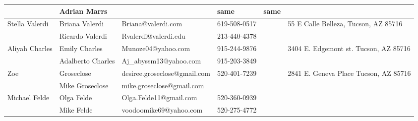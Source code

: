 \documentclass[landscape]{article}\usepackage[]{graphicx}\usepackage[]{color}
\begin{document}
\begin{longtable}{p{70pt}|p{75pt}|p{120pt}|p{60pt}|p{60pt}|p{120pt}|}
 & Adrian Marrs &  & same & same & \\
\hline
\multirow{2}{70pt}{Stella Valerdi} & Briana Valerdi & Briana@valerdi.com & 619-508-0517 &  & \multirow{2}{100pt}{55 E Calle Belleza, Tucson, AZ 85716} \\
 & Ricardo Valerdi & Rvalerdi@valerdi.edu & 213-440-4378 &  & \\
\hline
\multirow{2}{70pt}{Aliyah Charles} & Emily Charles  & Munoze04@yahoo.com & 915-244-9876 &  & \multirow{2}{100pt}{3404 E. Edgemont st. Tucson, AZ 85716} \\
 & Adalberto Charles & Aj\_abyssm13@yahoo.com & 915-203-3849 &  & \\
\hline
\multirow{2}{70pt}{Zoe} & Groseclose & desiree.groseclose@gmail.com & 520-401-7239 &  & \multirow{2}{100pt}{2841 E. Geneva Place Tucson, AZ 85716} \\
 & Mike Groseclose & mike.groseclose@gmail.com &  &  & \\
\hline
\multirow{2}{70pt}{Michael Felde} & Olga Felde & Olga.Felde11@gmail.com & 520-360-0939 &  & \multirow{2}{100pt}{} \\
 & Mike Felde & voodoomike69@yahoo.com & 520-275-4772 &  & \\
\hline
\end{longtable}
\newpage
\end{document}
